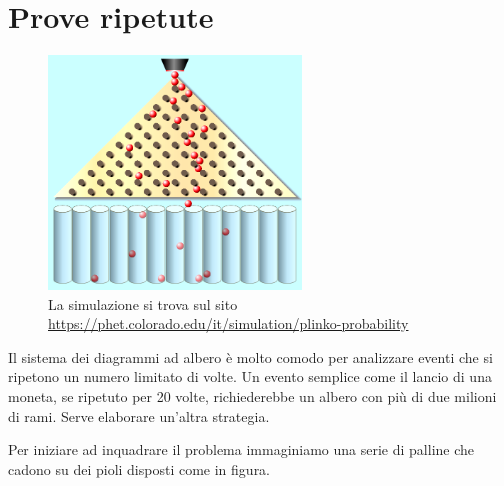 \section{Prove ripetute}

\begin{figure}
  \begin{center}
    \includegraphics[width=0.6\textwidth]{img/griglia.png}
  \end{center}
  \caption{La simulazione si trova sul sito 
\href{https://phet.colorado.edu/it/simulation/plinko-probability}
     {https://phet.colorado.edu/it/simulation/plinko-probability}}
\end{figure}

Il sistema dei diagrammi ad albero è molto comodo per analizzare eventi che 
si ripetono un numero limitato di volte. Un evento semplice come il lancio 
di 
una moneta, se ripetuto per 20 volte, richiederebbe un albero con più di 
due 
milioni di rami. Serve elaborare un'altra strategia. 

Per iniziare ad inquadrare il problema immaginiamo una serie di palline che 
cadono su dei pioli disposti come in figura. 

